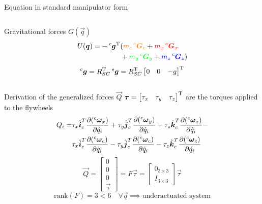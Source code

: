 \begin{frame}[shrink=30]{Equation in standard manipulator form}
\begin{columns}
\begin{column}{0.5\textwidth}
\begin{block}{Gravitational forces $G(\vec{q})$}
\[        \]
        \[
        \begin{split}
          U(\vec{q}) = - \prescript{c}{}{\vec{g}} \transpose
          &(\cubicFrame{m_c  \prescript{c}{}{\vec{G}}_c} +
          \qx{m_x  \prescript{c}{}{\vec{G}}_x} \\
          &+\qy{m_y  \prescript{c}{}{\vec{G}}_y} +
          \qz{m_z  \prescript{c}{}{\vec{G}}_z})
        \end{split}
        \]
        \[
        \prescript{c}{}{\vec{g}} = R_{SC}\transpose \prescript{s}{}{\vec{g}} = R_{SC}\transpose 
        \begin{bmatrix}
          0 & 0 & -g
        \end{bmatrix} \transpose
        \]
      \end{block}
    \end{column}
  \end{columns}
\end{frame}

\begin{frame}{Derivation of the generalized forces $\vec{Q}$}
  $\vec{\tau} = \begin{bmatrix}
    \tau_x & \tau_y &\tau_z
  \end{bmatrix} \transpose$ are the torques applied to the flywheels
  \[
  \begin{split}
    Q_i = & \tau_{x} \hat{\vec{i}}_c^{T} \frac{\partial (\prescript{c}{}{\vec{\omega}_x})}{\partial \dot{q}_i} +
    \tau_{y} \hat{\vec{j}}_c^{T} \frac{\partial (\prescript{c}{}{\vec{\omega}_y})}{\partial \dot{q}_i} +
    \tau_{z} \hat{\vec{k}}_c^{T} \frac{\partial (\prescript{c}{}{\vec{\omega}_z})}{\partial \dot{q}_i} -\\
    &\tau_{x} \hat{\vec{i}}_c^{T} \frac{\partial (\prescript{c}{}{\vec{\omega}_c})}{\partial \dot{q}_i} -
    \tau_{y} \hat{\vec{j}}_c^{T} \frac{\partial (\prescript{c}{}{\vec{\omega}_c})}{\partial \dot{q}_i} -
    \tau_{z} \hat{\vec{k}}_c^{T} \frac{\partial (\prescript{c}{}{\vec{\omega}_c})}{\partial \dot{q}_i}
  \end{split}
  \]
  \[
  \vec{Q} =
  \begin{bmatrix}
    0 \\ 0 \\ 0 \\ \vec{\tau}
  \end{bmatrix}
  = F \vec{\tau} = 
  \begin{bmatrix}
    0_{3\times3} \\
    I_{3\times3}
  \end{bmatrix} \vec{\tau}
  \]
  \[ 
  \text{rank}(F) = 3 < 6 \quad \forall \vec{q} \implies \text{underactuated system}
  \]
\end{frame}

